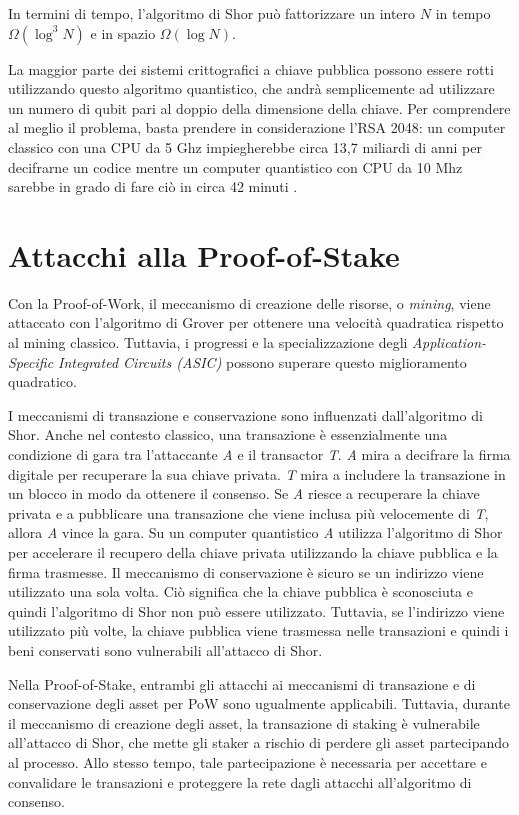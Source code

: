 In termini di tempo, l'algoritmo di Shor può fattorizzare un intero \(N\) in tempo \(\Omega(\log^3 N)\) e in spazio \(\Omega(\log N)\).

La maggior parte dei sistemi crittografici a chiave pubblica possono essere rotti utilizzando questo algoritmo quantistico, che andrà semplicemente ad utilizzare un numero di qubit pari al doppio della dimensione della chiave. Per comprendere al meglio il problema, basta prendere in considerazione l'RSA 2048: un computer classico con una CPU da 5 Ghz impiegherebbe circa 13,7 miliardi di anni per decifrarne un codice mentre un computer quantistico con CPU da 10 Mhz sarebbe in grado di fare ciò in circa 42 minuti \cite{kearney2021vulnerability}.

\section{Attacchi alla Proof-of-Stake}
Con la Proof-of-Work, il meccanismo di creazione delle risorse, o \textit{mining}, viene attaccato con l'algoritmo di Grover per ottenere una velocità quadratica rispetto al mining classico. Tuttavia, i progressi e la specializzazione degli \textit{Application-Specific Integrated Circuits (ASIC)} possono superare questo miglioramento quadratico.

I meccanismi di transazione e conservazione sono influenzati dall'algoritmo di Shor. Anche nel contesto classico, una transazione è essenzialmente una condizione di gara tra l'attaccante \textit{A} e il transactor \textit{T}. \textit{A} mira a decifrare la firma digitale per recuperare la sua chiave privata. \textit{T} mira a includere la transazione in un blocco in modo da ottenere il consenso. Se \textit{A} riesce a recuperare la chiave privata e a pubblicare una transazione che viene inclusa più velocemente di \textit{T}, allora \textit{A} vince la gara. Su un computer quantistico \textit{A} utilizza l'algoritmo di Shor per accelerare il recupero della chiave privata utilizzando la chiave pubblica e la firma trasmesse. Il meccanismo di conservazione è sicuro se un indirizzo viene utilizzato una sola volta. Ciò significa che la chiave pubblica è sconosciuta e quindi l'algoritmo di Shor non può essere utilizzato. Tuttavia, se l'indirizzo viene utilizzato più volte, la chiave pubblica viene trasmessa nelle transazioni e quindi i beni conservati sono vulnerabili all'attacco di Shor.

Nella Proof-of-Stake, entrambi gli attacchi ai meccanismi di transazione e di conservazione degli asset per PoW sono ugualmente applicabili. Tuttavia, durante il meccanismo di creazione degli asset, la transazione di staking è vulnerabile all'attacco di Shor, che mette gli staker a rischio di perdere gli asset partecipando al processo. Allo stesso tempo, tale partecipazione è necessaria per accettare e convalidare le transazioni e proteggere la rete dagli attacchi all'algoritmo di consenso.

